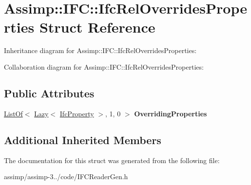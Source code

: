 \hypertarget{struct_assimp_1_1_i_f_c_1_1_ifc_rel_overrides_properties}{\section{Assimp\+:\+:I\+F\+C\+:\+:Ifc\+Rel\+Overrides\+Properties Struct Reference}
\label{struct_assimp_1_1_i_f_c_1_1_ifc_rel_overrides_properties}
}


Inheritance diagram for Assimp\+:\+:I\+F\+C\+:\+:Ifc\+Rel\+Overrides\+Properties\+:


Collaboration diagram for Assimp\+:\+:I\+F\+C\+:\+:Ifc\+Rel\+Overrides\+Properties\+:
\subsection*{Public Attributes}
\begin{DoxyCompactItemize}
\item 
\hypertarget{struct_assimp_1_1_i_f_c_1_1_ifc_rel_overrides_properties_ade8fbaf8ed78b7e74c2974c02323bbb1}{\hyperlink{struct_assimp_1_1_s_t_e_p_1_1_list_of}{List\+Of}$<$ \hyperlink{struct_assimp_1_1_s_t_e_p_1_1_lazy}{Lazy}$<$ \hyperlink{struct_assimp_1_1_i_f_c_1_1_ifc_property}{Ifc\+Property} $>$, 1, 0 $>$ {\bfseries Overriding\+Properties}}\label{struct_assimp_1_1_i_f_c_1_1_ifc_rel_overrides_properties_ade8fbaf8ed78b7e74c2974c02323bbb1}

\end{DoxyCompactItemize}
\subsection*{Additional Inherited Members}


The documentation for this struct was generated from the following file\+:\begin{DoxyCompactItemize}
\item 
assimp/assimp-\/3../code/I\+F\+C\+Reader\+Gen.\+h\end{DoxyCompactItemize}
